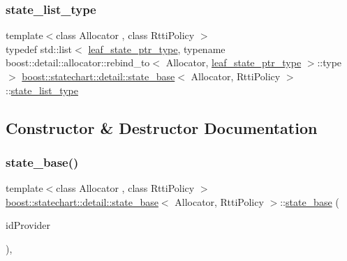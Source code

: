 \mbox{\label{classboost_1_1statechart_1_1detail_1_1state__base_a30bb6c4893e4cd84e80133feb2cc8230}} 
\subsubsection{\texorpdfstring{state\+\_\+list\+\_\+type}{state\_list\_type}}
{\footnotesize\ttfamily template$<$class Allocator , class Rtti\+Policy $>$ \\
typedef std\+::list$<$ \mbox{\hyperlink{classboost_1_1statechart_1_1detail_1_1state__base_a80b7d62ba0bb8e4fbef3e2e76e2a6021}{leaf\+\_\+state\+\_\+ptr\+\_\+type}}, typename boost\+::detail\+::allocator\+::rebind\+\_\+to$<$ Allocator, \mbox{\hyperlink{classboost_1_1statechart_1_1detail_1_1state__base_a80b7d62ba0bb8e4fbef3e2e76e2a6021}{leaf\+\_\+state\+\_\+ptr\+\_\+type}} $>$\+::type $>$ \mbox{\hyperlink{classboost_1_1statechart_1_1detail_1_1state__base}{boost\+::statechart\+::detail\+::state\+\_\+base}}$<$ Allocator, Rtti\+Policy $>$\+::\mbox{\hyperlink{classboost_1_1statechart_1_1detail_1_1state__base_a30bb6c4893e4cd84e80133feb2cc8230}{state\+\_\+list\+\_\+type}}}



\subsection{Constructor \& Destructor Documentation}
\mbox{\label{classboost_1_1statechart_1_1detail_1_1state__base_a8baed501f8a37ab2d7eb14af9b214d33}} 
\subsubsection{\texorpdfstring{state\+\_\+base()}{state\_base()}}
{\footnotesize\ttfamily template$<$class Allocator , class Rtti\+Policy $>$ \\
\mbox{\hyperlink{classboost_1_1statechart_1_1detail_1_1state__base}{boost\+::statechart\+::detail\+::state\+\_\+base}}$<$ Allocator, Rtti\+Policy $>$\+::\mbox{\hyperlink{classboost_1_1statechart_1_1detail_1_1state__base}{state\+\_\+base}} (\begin{DoxyParamCaption}\item[{typename Rtti\+Policy\+::id\+\_\+provider\+\_\+type}]{id\+Provider }\end{DoxyParamCaption})\hspace{0.3cm}{\ttfamily [inline]}, {\ttfamily [protected]}}

